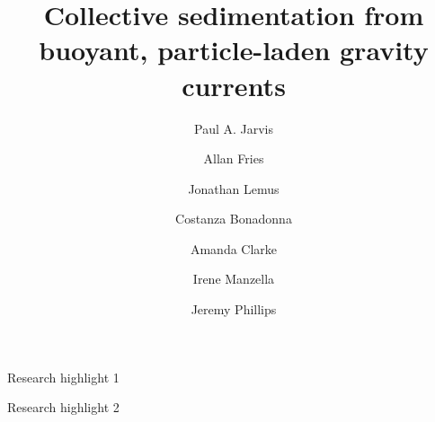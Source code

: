 \documentclass[authoryear,preprint,review,12pt]{elsarticle}
\begin{document}
\begin{frontmatter}



\title{Collective sedimentation from buoyant, particle-laden gravity currents}


\author[label1]{Paul A. Jarvis}
\author[label1]{Allan Fries}
\author[label1]{Jonathan Lemus}
\author[label1]{Costanza Bonadonna}
\author[label2]{Amanda Clarke}
\author[label3]{Irene Manzella}
\author[label4]{Jeremy Phillips}

\address[label1]{Department of Earth Sciences, University of Geneva, Rue des Mar{\"i}chers, Geneva, 1205, Switzerland}
\address[label2]{School of Earth and Space Exploration, Arizona State University, ISTB4-BLDG75, 781 E Terrance Mall, Tempe, AZ, 85287-6004, USA}
\address[label3]{School of Geography, Earth and Envrionmental Sciences, Univeristy of Plymouth, Drake Circus, Plymouth, PL4 8AA, UK}
\address[label4]{School of Earth Sciences, University of Bristol, Wills Memorial Building, Queens Road, Bristol, BS8 1RJ, UK}

\begin{abstract}

\end{abstract}

\begin{graphicalabstract}
\end{graphicalabstract}

\begin{highlights}
\item Research highlight 1
\item Research highlight 2
\end{highlights}


\end{frontmatter}
\end{document}
